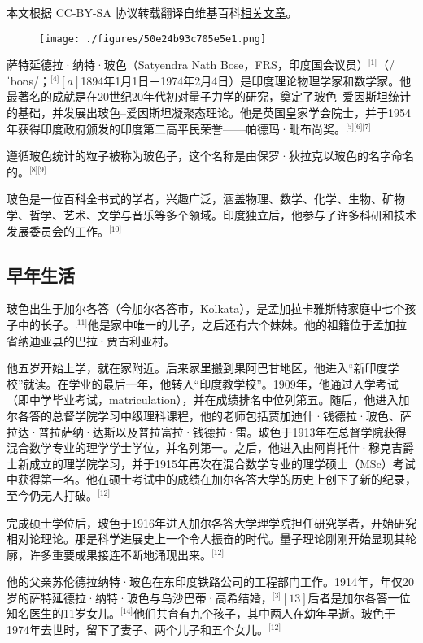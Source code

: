
本文根据 CC-BY-SA 协议转载翻译自维基百科\href{https://en.wikipedia.org/wiki/Satyendra_Nath_Bose}{相关文章}。

\begin{figure}[ht]
\centering
\texttt{[image: ./figures/50e24b93c705e5e1.png]}
\caption{} \label{fig_BOSE_8}
\end{figure}
萨特延德拉·纳特·玻色（Satyendra Nath Bose，FRS，印度国会议员）\(^\text{[1]}\)（/ˈboʊs/；\(^\text{[4]}[a]\)1894年1月1日－1974年2月4日）是印度理论物理学家和数学家。他最著名的成就是在20世纪20年代初对量子力学的研究，奠定了玻色–爱因斯坦统计的基础，并发展出玻色–爱因斯坦凝聚态理论。他是英国皇家学会院士，并于1954年获得印度政府颁发的印度第二高平民荣誉——帕德玛·毗布尚奖。\(^\text{[5][6][7]}\)

遵循玻色统计的粒子被称为玻色子，这个名称是由保罗·狄拉克以玻色的名字命名的。\(^\text{[8][9]}\)

玻色是一位百科全书式的学者，兴趣广泛，涵盖物理、数学、化学、生物、矿物学、哲学、艺术、文学与音乐等多个领域。印度独立后，他参与了许多科研和技术发展委员会的工作。\(^\text{[10]}\)
\subsection{早年生活}
玻色出生于加尔各答（今加尔各答市，Kolkata），是孟加拉卡雅斯特家庭中七个孩子中的长子。\(^\text{[11]}\)他是家中唯一的儿子，之后还有六个妹妹。他的祖籍位于孟加拉省纳迪亚县的巴拉·贾古利亚村。

他五岁开始上学，就在家附近。后来家里搬到果阿巴甘地区，他进入“新印度学校”就读。在学业的最后一年，他转入“印度教学校”。1909年，他通过入学考试（即中学毕业考试，matriculation），并在成绩排名中位列第五。随后，他进入加尔各答的总督学院学习中级理科课程，他的老师包括贾加迪什·钱德拉·玻色、萨拉达·普拉萨纳·达斯以及普拉富拉·钱德拉·雷。玻色于1913年在总督学院获得混合数学专业的理学学士学位，并名列第一。之后，他进入由阿肖托什·穆克吉爵士新成立的理学院学习，并于1915年再次在混合数学专业的理学硕士（MSc）考试中获得第一名。他在硕士考试中的成绩在加尔各答大学的历史上创下了新的纪录，至今仍无人打破。\(^\text{[12]}\)

完成硕士学位后，玻色于1916年进入加尔各答大学理学院担任研究学者，开始研究相对论理论。那是科学进展史上一个令人振奋的时代。量子理论刚刚开始显现其轮廓，许多重要成果接连不断地涌现出来。\(^\text{[12]}\)

他的父亲苏伦德拉纳特·玻色在东印度铁路公司的工程部门工作。1914年，年仅20岁的萨特延德拉·纳特·玻色与乌沙巴蒂·高希结婚，\(^\text{[3]}[13]\)后者是加尔各答一位知名医生的11岁女儿。\(^\text{[14]}\)他们共育有九个孩子，其中两人在幼年早逝。玻色于1974年去世时，留下了妻子、两个儿子和五个女儿。\(^\text{[12]}\)

